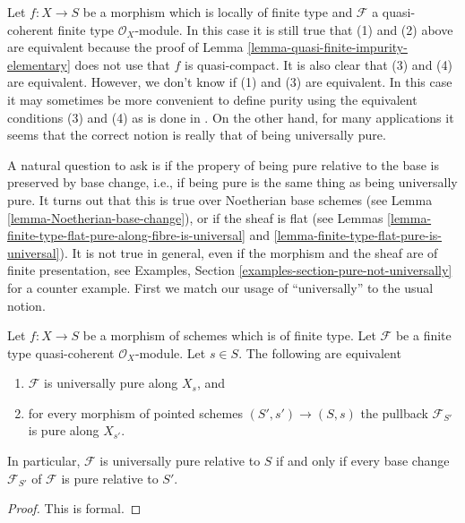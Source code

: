 \begin{remark}
\label{remark-discuss-finite-type}
Let $f : X \to S$ be a morphism which is locally of finite type
and $\mathcal{F}$ a quasi-coherent finite type $\mathcal{O}_X$-module.
In this case it is still true that (1) and (2) above are equivalent
because the proof of
Lemma \ref{lemma-quasi-finite-impurity-elementary}
does not use that $f$ is quasi-compact. It is also clear that
(3) and (4) are equivalent. However, we don't know if (1) and (3) are
equivalent. In this case it may sometimes be more convenient to define
purity using the equivalent conditions (3) and (4) as is done in \cite{GruRay}.
On the other hand, for many applications it seems that the correct notion
is really that of being universally pure.
\end{remark}

\noindent
A natural question to ask is if the propery of being pure relative to
the base is preserved by base change, i.e., if being pure is the same
thing as being universally pure. It turns out that this is true
over Noetherian base schemes (see
Lemma \ref{lemma-Noetherian-base-change}),
or if the sheaf is flat (see
Lemmas \ref{lemma-finite-type-flat-pure-along-fibre-is-universal} and
\ref{lemma-finite-type-flat-pure-is-universal}).
It is not true in general, even if the morphism and the sheaf are of
finite presentation, see
Examples, Section \ref{examples-section-pure-not-universally}
for a counter example. First we match our usage of ``universally''
to the usual notion.

\begin{lemma}
\label{lemma-base-change-universally}
Let $f : X \to S$ be a morphism of schemes which is of finite type.
Let $\mathcal{F}$ be a finite type quasi-coherent $\mathcal{O}_X$-module.
Let $s \in S$. The following are equivalent
\begin{enumerate}
\item $\mathcal{F}$ is universally pure along $X_s$, and
\item for every morphism of pointed schemes $(S', s') \to (S, s)$
the pullback $\mathcal{F}_{S'}$ is pure along $X_{s'}$.
\end{enumerate}
In particular, $\mathcal{F}$ is universally pure relative to $S$ if and
only if every base change $\mathcal{F}_{S'}$ of $\mathcal{F}$ is
pure relative to $S'$.
\end{lemma}

\begin{proof}
This is formal.
\end{proof}

